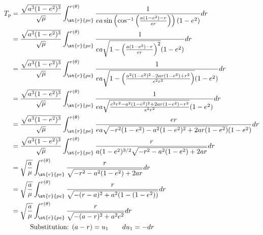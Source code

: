 \documentclass[../basicOrbitalDynamics.tex]{subfiles}
\begin{document}
\begin{align*}
    T_p & =\frac{\sqrt{a^3(1-e^2)^3}}{\sqrt{\mu}}\int_{\st{r}{pe}}^{r(\theta)}\frac{1}{ea\sin\left(\cos^{-1}\left(\frac{a(1-e^2)-r}{er}\right)\right)(1-e^2)}dr                                                         \\
        & =\frac{\sqrt{a^3(1-e^2)^3}}{\sqrt{\mu}}\int_{\st{r}{pe}}^{r(\theta)}\frac{1}{ea\sqrt{1-\left(\frac{a(1-e^2)-r}{er}\right)^2}(1-e^2)}dr                                                                        \\
        & =\frac{\sqrt{a^3(1-e^2)^3}}{\sqrt{\mu}}\int_{\st{r}{pe}}^{r(\theta)}\frac{1}{ea\sqrt{1-\left(\frac{a^2(1-e^2)^2-2ar(1-e^2)+r^2}{e^2r^2}\right)}(1-e^2)}dr                                                     \\
        & =\frac{\sqrt{a^3(1-e^2)^3}}{\sqrt{\mu}}\int_{\st{r}{pe}}^{r(\theta)}\frac{1}{ea\sqrt{\frac{e^2r^2-a^2(1-e^2)^2+2ar(1-e^2)-r^2}{e^2r^2}}(1-e^2)}dr                                                             \\
        & =\frac{\sqrt{a^3(1-e^2)^3}}{\sqrt{\mu}}\int_{\st{r}{pe}}^{r(\theta)}\frac{er}{ea\sqrt{-r^2(1-e^2)-a^2(1-e^2)^2+2ar(1-e^2 )}(1-e^2)}dr                                                                         \\
        & =\frac{\sqrt{a^3(1-e^2)^3}}{\sqrt{\mu}}\int_{\st{r}{pe}}^{r(\theta)}\frac{r}{a(1-e^2)^{3/2}\sqrt{-r^2-a^2(1-e^2)+2ar}}dr                                                                                      \\
        & =\sqrt{\frac{a}{\mu}}\int_{\st{r}{pe}}^{r(\theta)}\frac{r}{\sqrt{-r^2-a^2(1-e^2)+2ar}}dr                                                                                                                      \\
        & =\sqrt{\frac{a}{\mu}}\int_{\st{r}{pe}}^{r(\theta)}\frac{r}{\sqrt{-(r-a)^2+a^2(1-(1-e^2))}}dr                                                                                                                  \\
        & =\sqrt{\frac{a}{\mu}}\int_{\st{r}{pe}}^{r(\theta)}\frac{r}{\sqrt{-(a-r)^2+a^2e^2}}dr                                                                                                                          \\
        & \phantom{=}\qquad{}\text{Substitution: }(a-r)=u_1\qquad{}du_1=-dr                                                                                                                                              \\

\end{align*}
\end{document}
